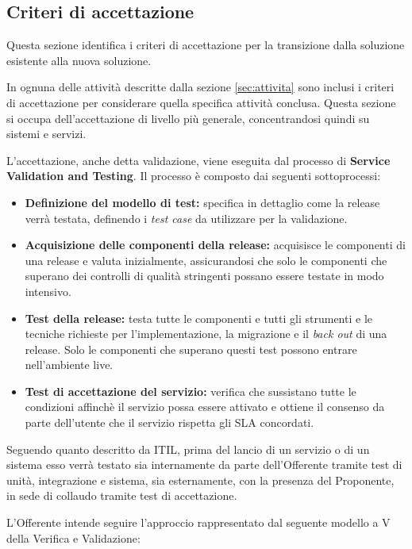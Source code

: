               
		\subsection{Criteri di accettazione}
        	Questa sezione identifica i criteri di accettazione per la transizione dalla soluzione esistente alla nuova soluzione.
            
            
            In ognuna delle attività descritte dalla sezione \ref{sec:attivita} sono inclusi i criteri di accettazione per considerare quella specifica attività conclusa. Questa sezione si occupa dell'accettazione di livello più generale, concentrandosi quindi su sistemi e servizi.
            
            
            L'accettazione, anche detta validazione, viene eseguita dal processo di \textbf{Service Validation and Testing}. Il processo è composto dai seguenti sottoprocessi:
            \begin{itemize}
            \item \textbf{Definizione del modello di test:} specifica in dettaglio come la release verrà testata, definendo i \textit{test case} da utilizzare per la validazione.
            \item \textbf{Acquisizione delle componenti della release:} acquisisce le componenti di una release e valuta inizialmente, assicurandosi che solo le componenti che superano dei controlli di qualità stringenti possano essere testate in modo intensivo.
            \item \textbf{Test della release:} testa tutte le componenti e tutti gli strumenti e le tecniche richieste per l'implementazione, la migrazione e il \textit{back out} di una release. Solo le componenti che superano questi test possono entrare nell'ambiente live.
            \item \textbf{Test di accettazione del servizio:} verifica che sussistano tutte le condizioni affinchè il servizio possa essere attivato e ottiene il consenso da parte dell'utente che il servizio rispetta gli SLA concordati.
            \end{itemize}
           
           Seguendo quanto descritto da ITIL, prima del lancio di un servizio o di un sistema esso verrà testato sia internamente da parte dell'Offerente tramite test di unità, integrazione e sistema, sia esternamente, con la presenza del Proponente, in sede di collaudo tramite test di accettazione. 
           
           
           L'Offerente intende seguire l'approccio rappresentato dal seguente modello a V della Verifica e Validazione:
           
